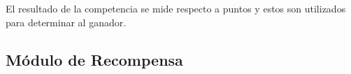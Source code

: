  \noindent El resultado de la competencia se mide respecto a puntos y estos son
 utilizados para determinar al ganador.






\subsection*{Módulo de Recompensa}
%

